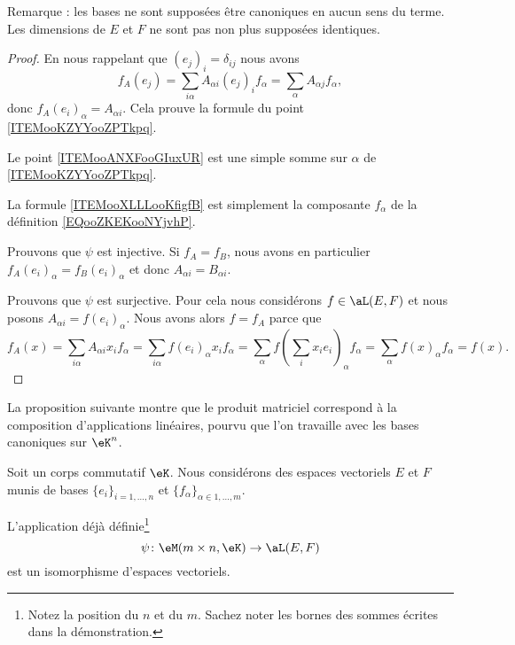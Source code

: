 Remarque : les bases ne sont supposées être canoniques en aucun sens du terme. Les dimensions de \( E\) et \( F\) ne sont pas non plus supposées identiques.

\begin{proof}
    En nous rappelant que \( (e_j)_i=\delta_{ij}\) nous avons
    \begin{equation}        \label{EQooWGZHooIBoygB}
        f_A(e_j)=\sum_{i\alpha}A_{\alpha i}(e_j)_if_{\alpha}=\sum_{\alpha}A_{\alpha j}f_{\alpha},
    \end{equation}
    donc \( f_A(e_i)_{\alpha}=A_{\alpha i}\). Cela prouve la formule du point \ref{ITEMooKZYYooZPTkpq}.

    Le point \ref{ITEMooANXFooGIuxUR} est une simple somme sur \( \alpha\) de \ref{ITEMooKZYYooZPTkpq}.

    La formule \eqref{ITEMooXLLLooKfigfB} est simplement la composante \( f_{\alpha}\) de la définition \ref{EQooZKEKooNYjvhP}.

    Prouvons que \( \psi\) est injective. Si \( f_A=f_B\), nous avons en particulier \( f_A(e_i)_{\alpha}=f_B(e_i)_{\alpha}\) et donc \( A_{\alpha i}=B_{\alpha i}\).

    Prouvons que \( \psi\) est surjective. Pour cela nous considérons \( f\in \aL(E,F)\) et nous posons \( A_{\alpha i}=f(e_i)_{\alpha}\). Nous avons alors \( f=f_A\) parce que
    \begin{equation}
        f_A(x)=\sum_{i\alpha}A_{\alpha i}x_if_{\alpha}=\sum_{i\alpha}f(e_i)_{\alpha}x_if_{\alpha}=\sum_{\alpha}f(\sum_ix_ie_i)_{\alpha}f_{\alpha}=\sum_{\alpha}f(x)_{\alpha}f_{\alpha}=f(x).
    \end{equation}
\end{proof}

La proposition suivante montre que le produit matriciel correspond à la composition d'applications linéaires, pourvu que l'on travaille avec les bases canoniques sur \( \eK^n\).
\begin{proposition}      \label{PROPooIYVQooOiuRhX}
    Soit un corps commutatif \( \eK\). Nous considérons des espaces vectoriels \( E\) et \( F\) munis de bases \( \{ e_i \}_{i=1,\ldots, n}\) et \( \{ f_{\alpha}\}_{\alpha\in 1,\ldots, m} \).

    L'application déjà définie\footnote{Notez la position du \( n\) et du \( m\). Sachez noter les bornes des sommes écrites dans la démonstration.}
    \begin{equation}
        \psi\colon \eM(m\times n,\eK)\to \aL(E,F)
    \end{equation}
    est un isomorphisme d'espaces vectoriels.
\end{proposition}


